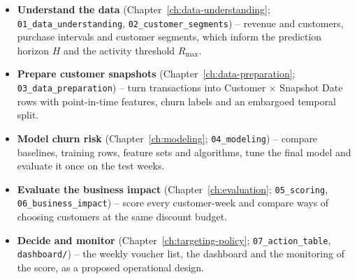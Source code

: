 \begin{itemize}
    \item \textbf{Understand the data} (Chapter~\ref{ch:data-understanding}; \texttt{01\_data\_understanding}, \texttt{02\_customer\_segments}) -- revenue and customers, purchase intervals and customer segments, which inform the prediction horizon $H$ and the activity threshold $R_{\max}$.
    \item \textbf{Prepare customer snapshots} (Chapter~\ref{ch:data-preparation}; \texttt{03\_data\_preparation}) -- turn transactions into Customer $\times$ Snapshot Date rows with point-in-time features, churn labels and an embargoed temporal split.
    \item \textbf{Model churn risk} (Chapter~\ref{ch:modeling}; \texttt{04\_modeling}) -- compare baselines, training rows, feature sets and algorithms, tune the final model and evaluate it once on the test weeks.
    \item \textbf{Evaluate the business impact} (Chapter~\ref{ch:evaluation}; \texttt{05\_scoring}, \texttt{06\_business\_impact}) -- score every customer-week and compare ways of choosing customers at the same discount budget.
    \item \textbf{Decide and monitor} (Chapter~\ref{ch:targeting-policy}; \texttt{07\_action\_table}, \texttt{dashboard/}) -- the weekly voucher list, the dashboard and the monitoring of the score, as a proposed operational design.
\end{itemize}
